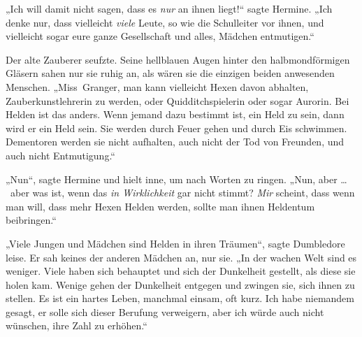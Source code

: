 „Ich will damit nicht sagen, dass es \emph{nur} an ihnen liegt!“ sagte Hermine.
„Ich denke nur, dass vielleicht \emph{viele} Leute, so wie die Schulleiter vor ihnen, und vielleicht sogar eure ganze Gesellschaft und alles, Mädchen entmutigen.“

Der alte Zauberer seufzte. Seine hellblauen Augen hinter den halbmondförmigen Gläsern sahen nur sie ruhig an, als wären sie die einzigen beiden anwesenden Menschen.
„Miss~Granger, man kann vielleicht Hexen davon abhalten, Zauberkunstlehrerin zu werden, oder Quidditchspielerin oder sogar Aurorin. Bei Helden ist das anders. Wenn jemand dazu bestimmt ist, ein Held zu sein, dann wird er ein Held sein. Sie werden durch Feuer gehen und durch Eis schwimmen. Dementoren werden sie nicht aufhalten, auch nicht der Tod von Freunden, und auch nicht Entmutigung.“

„Nun“, sagte Hermine und hielt inne, um nach Worten zu ringen.
„Nun, aber … ~aber was ist, wenn das \emph{in Wirklichkeit} gar nicht stimmt? \emph{Mir} scheint, dass wenn man will, dass mehr Hexen Helden werden, sollte man ihnen Heldentum beibringen.“

„Viele Jungen und Mädchen sind Helden in ihren Träumen“, sagte Dumbledore leise. Er sah keines der anderen Mädchen an, nur sie.
„In der wachen Welt sind es weniger. Viele haben sich behauptet und sich der Dunkelheit gestellt, als diese sie holen kam. Wenige gehen der Dunkelheit entgegen und zwingen sie, sich ihnen zu stellen. Es ist ein hartes Leben, manchmal einsam, oft kurz. Ich habe niemandem gesagt, er solle sich dieser Berufung verweigern, aber ich würde auch nicht wünschen, ihre Zahl zu erhöhen.“

